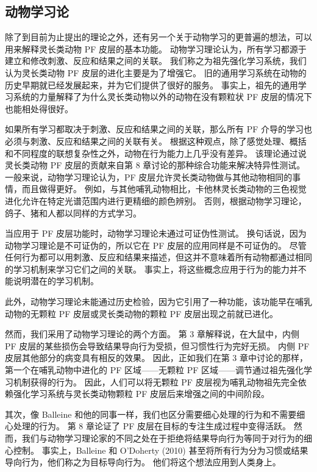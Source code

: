 \subsection{动物学习论}
除了到目前为止提出的理论之外，还有另一个关于动物学习的更普遍的想法，可以用来解释灵长类动物 PF 皮层的基本功能。 动物学习理论认为，所有学习都源于建立和修改刺激、反应和结果之间的关联。 我们称之为祖先强化学习系统，我们认为灵长类动物 PF 皮层的进化主要是为了增强它。 旧的通用学习系统在动物的历史早期就已经发展起来，并为它们提供了很好的服务。 事实上，祖先的通用学习系统的力量解释了为什么灵长类动物以外的动物在没有颗粒状 PF 皮层的情况下也能相处得很好。
\par 
如果所有学习都取决于刺激、反应和结果之间的关联，那么所有 PF 介导的学习也必须与刺激、反应和结果之间的关联有关。 根据这种观点，除了感觉处理、概括和不同程度的联想复杂性之外，动物在行为能力上几乎没有差异。 该理论通过说灵长类动物 PF 皮层的贡献来自第 8 章讨论的那种综合功能来解决特异性测试。 一般来说，动物学习理论认为，PF 皮层允许灵长类动物做与其他动物相同的事情，而且做得更好。 例如，与其他哺乳动物相比，卡他林灵长类动物的三色视觉进化允许在特定光谱范围内进行更精细的颜色辨别。 否则，根据动物学习理论，鸽子、猪和人都以同样的方式学习。
\par 
当应用于 PF 皮层功能时，动物学习理论未通过可证伪性测试。 换句话说，因为动物学习理论是不可证伪的，所以它在 PF 皮层的应用同样是不可证伪的。 尽管任何行为都可以用刺激、反应和结果来描述，但这并不意味着所有动物都通过相同的学习机制来学习它们之间的关联。 事实上，将这些概念应用于行为的能力并不能说明潜在的学习机制。
\par 
此外，动物学习理论未能通过历史检验，因为它引用了一种功能，该功能早在哺乳动物的无颗粒 PF 皮层或灵长类动物的颗粒 PF 皮层出现之前就已进化。
\par 
然而，我们采用了动物学习理论的两个方面。 第 3 章解释说，在大鼠中，内侧 PF 皮层的某些损伤会导致结果导向行为受损，但习惯性行为完好无损。 内侧 PF 皮层其他部分的病变具有相反的效果。 因此，正如我们在第 3 章中讨论的那样，第一个在哺乳动物中进化的 PF 区域——无颗粒 PF 区域——调节通过祖先强化学习机制获得的行为。 因此，人们可以将无颗粒 PF 皮层视为哺乳动物祖先完全依赖强化学习系统与灵长类动物颗粒 PF 皮层后来增强之间的中间阶段。
\par 
其次，像 Balleine 和他的同事一样，我们也区分需要细心处理的行为和不需要细心处理的行为。 第 8 章论证了 PF 皮层在目标的专注生成过程中变得活跃。 然而，我们与动物学习理论家的不同之处在于拒绝将结果导向行为等同于对行为的细心控制。 事实上，Balleine 和 O’Doherty (2010) 甚至将所有行为分为习惯或结果导向行为，他们称之为目标导向行为。 他们将这个想法应用到人类身上。
